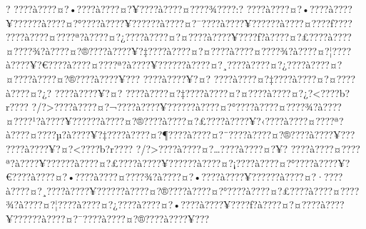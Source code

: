 \documentclass[11pt, openany]{book}
\begin{document}
?
???\textbar{}?à???\textbar{}?¤?•???\textbar{}?à???\textbar{}?¤?¥???\textbar{}?à???\textbar{}?¤???\textbar{}?¾???\textbar{}?:?
???\textbar{}?à???\textbar{}?¤?•???\textbar{}?à???\textbar{}?¥?????\textbar{}?à???\textbar{}?¤?°???\textbar{}?à???\textbar{}?¥?????\textbar{}?à???\textbar{}?¤?¯???\textbar{}?à???\textbar{}?¥?????\textbar{}?à???\textbar{}?¤???\textbar{}?ƒ???\textbar{}?
???\textbar{}?à???\textbar{}?¤???\textbar{}?ª?à???\textbar{}?¤?¿???\textbar{}?à???\textbar{}?¤?¤???\textbar{}?à???\textbar{}?¥???\textbar{}?ƒ?à???\textbar{}?¤?£???\textbar{}?à???\textbar{}?¤???\textbar{}?¾?à???\textbar{}?¤?®???\textbar{}?à???\textbar{}?¥?‡???\textbar{}?à???\textbar{}?¤?¤???\textbar{}?à???\textbar{}?¤???\textbar{}?¾?à???\textbar{}?¤?¦???\textbar{}?à???\textbar{}?¥?€???\textbar{}?à???\textbar{}?¤???\textbar{}?ª?à???\textbar{}?¥?????\textbar{}?à???\textbar{}?¤?¸???\textbar{}?à???\textbar{}?¤?¿???\textbar{}?à???\textbar{}?¤?¤???\textbar{}?à???\textbar{}?¤?®???\textbar{}?à???\textbar{}?¥???
???\textbar{}?à???\textbar{}?¥?¤?
???\textbar{}?à???\textbar{}?¤?‡???\textbar{}?à???\textbar{}?¤?¤???\textbar{}?à???\textbar{}?¤?¿?
???\textbar{}?à???\textbar{}?¥?¤?
???\textbar{}?à???\textbar{}?¤?‡???\textbar{}?à???\textbar{}?¤?¤???\textbar{}?à???\textbar{}?¤?¿?\textless{}???\textbar{}?b?r???\textbar{}?
?/?\textgreater{}???\textbar{}?à???\textbar{}?¤?¬???\textbar{}?à???\textbar{}?¥?????\textbar{}?à???\textbar{}?¤?°???\textbar{}?à???\textbar{}?¤???\textbar{}?¾?à???\textbar{}?¤???\textbar{}?¹?à???\textbar{}?¥?????\textbar{}?à???\textbar{}?¤?®???\textbar{}?à???\textbar{}?¤?£???\textbar{}?à???\textbar{}?¥?‹???\textbar{}?à???\textbar{}?¤???\textbar{}?ª?à???\textbar{}?¤???\textbar{}?µ?à???\textbar{}?¥?‡???\textbar{}?à???\textbar{}?¤?¶???\textbar{}?à???\textbar{}?¤?¨???\textbar{}?à???\textbar{}?¤?®???\textbar{}?à???\textbar{}?¥???
???\textbar{}?à???\textbar{}?¥?¤?\textless{}???\textbar{}?b?r???\textbar{}?
?/?\textgreater{}???\textbar{}?à???\textbar{}?¤?\ldots{}???\textbar{}?à???\textbar{}?¤?¥?
???\textbar{}?à???\textbar{}?¤???\textbar{}?ª?à???\textbar{}?¥?????\textbar{}?à???\textbar{}?¤?£???\textbar{}?à???\textbar{}?¥?????\textbar{}?à???\textbar{}?¤?¡???\textbar{}?à???\textbar{}?¤?°???\textbar{}?à???\textbar{}?¥?€???\textbar{}?à???\textbar{}?¤?•???\textbar{}?à???\textbar{}?¤???\textbar{}?¾?à???\textbar{}?¤?•???\textbar{}?à???\textbar{}?¥?????\textbar{}?à???\textbar{}?¤?·???\textbar{}?à???\textbar{}?¤?¸???\textbar{}?à???\textbar{}?¥?????\textbar{}?à???\textbar{}?¤?®???\textbar{}?à???\textbar{}?¤?°???\textbar{}?à???\textbar{}?¤?£???\textbar{}?à???\textbar{}?¤???\textbar{}?¾?à???\textbar{}?¤?¦???\textbar{}?à???\textbar{}?¤?¿???\textbar{}?à???\textbar{}?¤?•???\textbar{}?à???\textbar{}?¥???\textbar{}?ƒ?à???\textbar{}?¤?¤???\textbar{}?à???\textbar{}?¥?????\textbar{}?à???\textbar{}?¤?¯???\textbar{}?à???\textbar{}?¤?®???\textbar{}?à???\textbar{}?¥???
\end{document}
